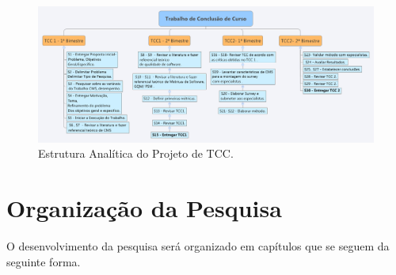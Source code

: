 \begin{landscape}
\begin{figure}[!htb]
\centering
\includegraphics[keepaspectratio=true,scale= 0.58]{figuras/EAP.png}
\caption{Estrutura Analítica do Projeto de TCC.}
\label{EAP}
\end{figure}
\end{landscape}

\section{Organização da Pesquisa}

O desenvolvimento da pesquisa será organizado em capítulos que se seguem da seguinte forma.

